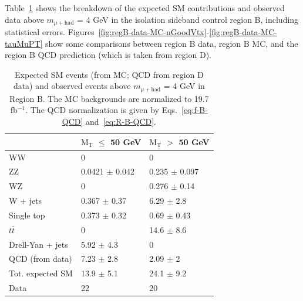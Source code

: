 Table~\ref{tab:regB-predictions} shows the breakdown of the expected SM contributions and observed data above $m_{\mu+\text{had}}$ = 4 GeV in the isolation sideband control region B, including statistical errors.  Figures~\ref{fig:regB-data-MC-nGoodVtx}-\ref{fig:regB-data-MC-tauMuPT} show some comparisons between region B data, region B MC, and the region B QCD prediction (which is taken from region D).

\begin{table}[htbH]
\begin{center}
\caption{Expected SM events (from MC; QCD from region D data) and observed events above $m_{\mu+\text{had}}$ = 4 GeV in Region B.  The MC backgrounds are normalized to 19.7 fb$^{-1}$.  The QCD normalization is given by Eqs.~\ref{eq:f-B-QCD} and~\ref{eq:R-B-QCD}.\label{tab:regB-predictions}}
\begin{tabular}{lll}
\hline & $\text{M}_{\text{T}}$ $\le$ 50 GeV & $\text{M}_{\text{T}}$ $>$ 50 GeV \\
\hline
WW & 0 & 0 \\
ZZ & 0.0421 $\pm$ 0.042 & 0.235 $\pm$ 0.097 \\
WZ & 0 & 0.276 $\pm$ 0.14 \\
W + jets & 0.367 $\pm$ 0.37 & 6.29 $\pm$ 2.8 \\
Single top & 0.373 $\pm$ 0.32 & 0.69 $\pm$ 0.43 \\
$t\bar{t}$ & 0 & 14.6 $\pm$ 8.6 \\
Drell-Yan + jets & 5.92 $\pm$ 4.3 & 0 \\
QCD (from data) & 7.23 $\pm$ 2.8 & 2.09 $\pm$ 2 \\
\hline
Tot. expected SM & 13.9 $\pm$ 5.1 & 24.1 $\pm$ 9.2 \\
\hline
Data & 22 & 20 \\
\hline
\end{tabular}
\end{center}
\end{table}

